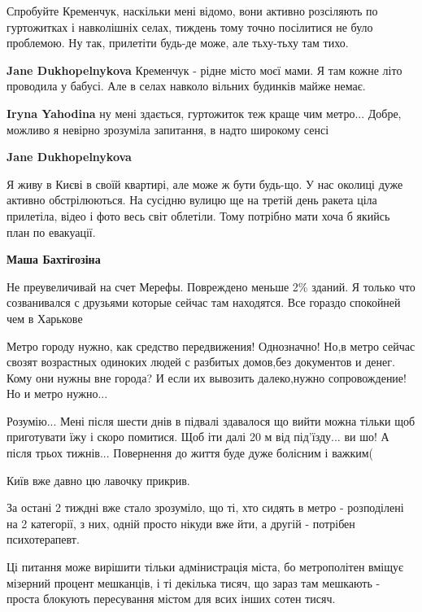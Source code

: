 \begin{itemize}
\begin{itemize}
Спробуйте Кременчук, наскільки мені відомо, вони активно розсіляють по
гуртожитках і навколішніх селах, тиждень тому точно посілитися не було
проблемою. Ну так, прилетіти будь-де може, але тьху-тьху там тихо.

\textbf{Jane Dukhopelnykova} Кременчук - рідне місто моєї мами. Я там кожне літо проводила у бабусі. Але в селах навколо вільних будинків майже немає.

\textbf{Iryna Yahodina} ну мені здається, гуртожиток теж краще чим метро... Добре, можливо я невірно зрозуміла запитання, в надто широкому сенсі

\textbf{Jane Dukhopelnykova} 

Я живу в Києві в своїй квартирі, але може ж бути будь-що. У нас околиці дуже
активно обстрілюються. На сусідню вулицю ще на третій день ракета ціла
прилетіла, відео і фото весь світ облетіли. Тому потрібно мати хоча б якийсь
план по евакуації.

\textbf{Маша Бахтігозіна} 

Не преувеличивай на счет Мерефы. Повреждено меньше 2\% зданий. Я только что
созванивался с друзьями которые сейчас там находятся. Все гораздо спокойней чем
в Харькове

\end{itemize} %


Метро городу нужно, как средство передвижения! Однозначно! Но,в метро сейчас
свозят возрастных одиноких людей с разбитых домов,без документов и денег. Кому
они нужны вне города? И если их вывозить далеко,нужно сопровождение! Но и метро
нужно...


Розумію... Мені після шести днів в підвалі здавалося що вийти можна тільки щоб
приготувати їжу і скоро помитися. Щоб іти далі 20 м від під'їзду... ви шо! А
після трьох тижнів... Повернення до життя буде дуже болісним і важким(


Київ вже давно цю лавочку прикрив.

За остані 2 тиждні вже стало зрозуміло, що ті, хто сидять в метро - розподілені
на 2 категорії, з них, одній просто нікуди вже йти, а другій - потрібен
психотерапевт.

Ці питання може вирішити тільки адмінистрація міста, бо метрополітен вміщує
мізерний процент мешканців, і ті декілька тисяч, що зараз там мешкають - проста
блокують пересування містом для всих інших сотен тисяч.


\end{itemize}
